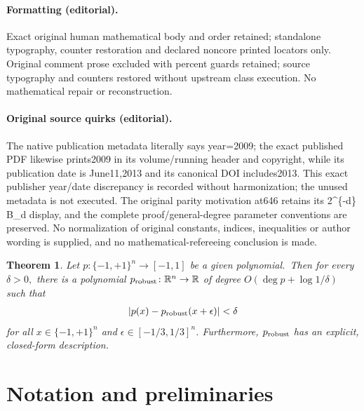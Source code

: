 \documentclass[10pt]{article}
\newtheorem{theorem}{Theorem}[section]
\theoremstyle{definition}
\numberwithin{equation}{section}
\newcommand{\R}{{\mathbb R}}
\newcommand{\moo}{\{-1,+1\}}
\newcommand{\moon}{\moo^n}
\begin{document}
\paragraph{Formatting (editorial).} Exact original human mathematical body and order retained; standalone typography, counter restoration and declared noncore printed locators only. Original comment prose excluded with percent guards retained; source typography and counters restored without upstream class execution. No mathematical repair or reconstruction.
\paragraph{Original source quirks (editorial).} The native publication metadata literally says year=2009; the exact published PDF likewise prints2009 in its volume/running header and copyright, while its publication date is June11,2013 and its canonical DOI includes2013. This exact publisher year/date discrepancy is recorded without harmonization; the unused metadata is not executed. The original parity motivation at646 retains its 2\textasciicircum{}\{-d\} B\_d display, and the complete proof/general-degree parameter conventions are preserved. No normalization of original constants, indices, inequalities or author wording is supplied, and no mathematical-refereeing conclusion is made.
\endgroup
\clearpage
\setcounter{section}{1}\setcounter{theorem}{0}
\begin{theorem}
\label{thm:main}
Let $p\colon\moon\to[-1,1]$ be a given polynomial.\ Then
for every $\delta>0,$ there is a polynomial $p_\text{\rm
robust}\colon\R^n\to\R$ of
degree $O(\deg p+\log 1/\delta)$ such that 
\begin{align*}
   \left|p(x) - p_\text{\rm robust}(x+\epsilon)\right| <\delta
\end{align*}
for all $x\in\moon$ and $\epsilon\in[-1/3,1/3]^n$.
Furthermore, $p_\text{\rm robust}$ has an explicit, closed-form
description.
\end{theorem}
\setcounter{section}{1}
\section{Notation and preliminaries}
\label{sec:prelim}
\end{document}
